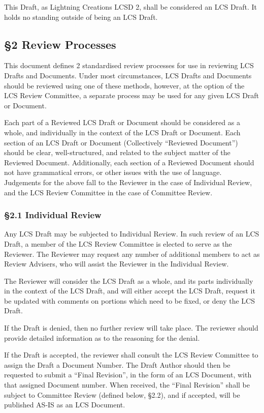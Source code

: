 This Draft, as Lightning Creations LCSD 2, shall be considered an LCS
Draft. It holds no standing outside of being an LCS Draft.

\subsection{§2 Review Processes}\label{review-processes}

This document defines 2 standardised review processes for use in
reviewing LCS Drafts and Documents. Under most circumstances, LCS Drafts
and Documents should be reviewed using one of these methods, however, at
the option of the LCS Review Committee, a separate process may be used
for any given LCS Draft or Document.

Each part of a Reviewed LCS Draft or Document should be considered as a
whole, and individually in the context of the LCS Draft or Document.
Each section of an LCS Draft or Document (Collectively ``Reviewed
Document'') should be clear, well-structured, and related to the subject
matter of the Reviewed Document. Additionally, each section of a
Reviewed Document should not have grammatical errors, or other issues
with the use of language. Judgements for the above fall to the Reviewer
in the case of Individual Review, and the LCS Review Committee in the
case of Committee Review.

\subsubsection{§2.1 Individual Review}\label{individual-review}

Any LCS Draft may be subjected to Individual Review. In such review of
an LCS Draft, a member of the LCS Review Committee is elected to serve
as the Reviewer. The Reviewer may request any number of additional
members to act as Review Advisers, who will assist the Reviewer in the
Individual Review.

The Reviewer will consider the LCS Draft as a whole, and its parts
individually in the context of the LCS Draft, and will either accept the
LCS Draft, request it be updated with comments on portions which need to
be fixed, or deny the LCS Draft.

If the Draft is denied, then no further review will take place. The
reviewer should provide detailed information as to the reasoning for the
denial.

If the Draft is accepted, the reviewer shall consult the LCS Review
Committee to assign the Draft a Document Number. The Draft Author should
then be requested to submit a ``Final Revision'', in the form of an LCS
Document, with that assigned Document number. When received, the ``Final
Revision'' shall be subject to Committee Review (defined below, §2.2),
and if accepted, will be published AS-IS as an LCS Document.

